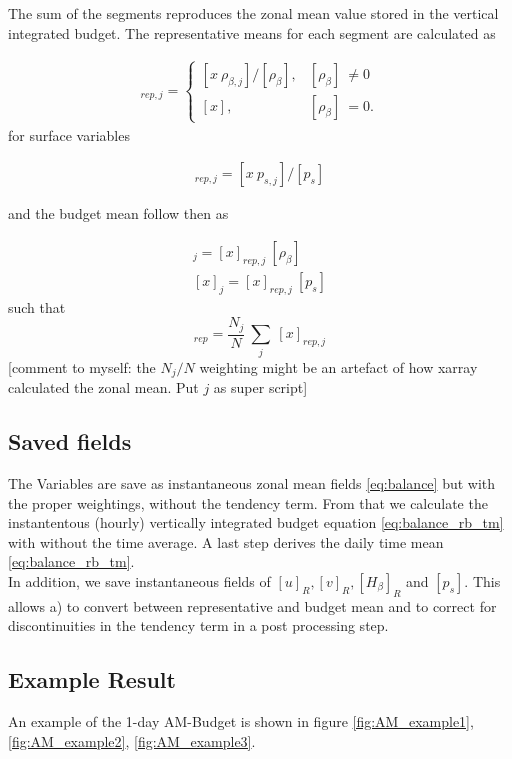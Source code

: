 \documentclass[11pt]{article}
\numberwithin{equation}{section}
\newcommand{\beq}{\begin{equation}}
\newcommand{\eeq}{\end{equation}}
\newcommand{\comment}[1]{{\color{red}[#1]}}
\begin{document}
The sum of the segments reproduces the zonal mean value stored in the vertical integrated budget.
The representative means for each segment are calculated as 

\begin{align}
[x]_{rep,j} = \begin{cases}  
       [ x ~\rho_{\beta,j} ] /  [  \rho_\beta ]  , &  [  \rho_\beta ]  ~ \ne 0  \\
       [ x ] , & [  \rho_\beta ]  ~= 0.
    \end{cases} 
\end{align}
for surface variables

\begin{align}
[x]_{rep,j} = 
       [ x ~p_{s,j} ] /  [  p_s ] 
\end{align}

and the budget mean follow then as

\begin{align}
[x]_{j}  = [x]_{rep,j}~   [  \rho_\beta ]  \\
[x]_{j}  = [x]_{rep,j}~   [  p_s ]  
\end{align}
such that 
\beq
[x]_{rep} =\frac{N_j}{N} ~\sum_j ~[x]_{rep,j} 
\eeq
\comment{comment to myself: the $N_j /N$ weighting might be an artefact of how xarray calculated the zonal mean. Put $j$ as super script}


\subsection{Saved fields}
The Variables are save as instantaneous zonal mean fields \eqref{eq:balance} but with the proper weightings, without the tendency term. From that we calculate the instantentous (hourly) vertically integrated budget equation \eqref{eq:balance_rb_tm} with without the time average. A last step derives the daily time mean \eqref{eq:balance_rb_tm}.\\
In addition, we save instantaneous fields of  $[u]_R, [v]_R,  [H_\beta]_R$ and $[p_s]$. This allows a) to convert between representative and budget mean and to correct for discontinuities in the tendency term in a post processing step. 



\subsection{Example Result}
An example of the 1-day AM-Budget is shown in figure \ref{fig:AM_example1}, \ref{fig:AM_example2}, \ref{fig:AM_example3}.
\end{document}
